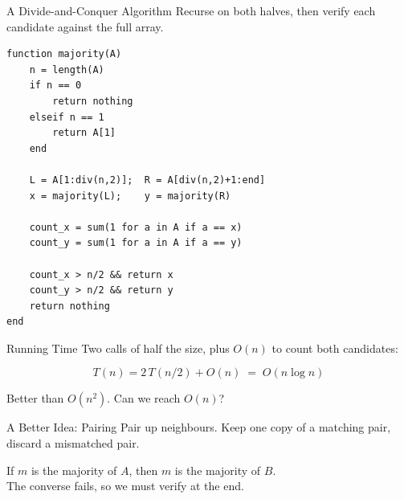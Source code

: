 \documentclass[10pt,aspectratio=169]{beamer}
\begin{document}
\begin{frame}[fragile]{A Divide-and-Conquer Algorithm}
  Recurse on both halves, then verify each candidate against the full array.

  \begin{lstlisting}
function majority(A)
    n = length(A)
    if n == 0
        return nothing
    elseif n == 1
        return A[1]
    end

    L = A[1:div(n,2)];  R = A[div(n,2)+1:end]
    x = majority(L);    y = majority(R)

    count_x = sum(1 for a in A if a == x)
    count_y = sum(1 for a in A if a == y)

    count_x > n/2 && return x
    count_y > n/2 && return y
    return nothing
end
  \end{lstlisting}
\end{frame}

\begin{frame}{Running Time}
  Two calls of half the size, plus $O(n)$ to count both candidates:

  \begin{alertblock}{}
    \[
      T(n) = 2\,T(n/2) + O(n) \;=\; O(n \log n)
    \]
  \end{alertblock}

  \bigskip
  \begin{center}
    Better than $O(n^2)$. \quad Can we reach $O(n)$?
  \end{center}
\end{frame}

\begin{frame}{A Better Idea: Pairing}
  Pair up neighbours. Keep \alert{one copy} of a matching pair, \alert{discard} a mismatched pair.

  \bigskip
  \begin{center}
  \end{center}

  \bigskip
  \begin{center}
    If $m$ is the majority of $A$, then $m$ is the majority of $B$.\\
    \smallskip
    \small The converse fails, so we must verify at the end.
  \end{center}
\end{frame}
\end{document}
